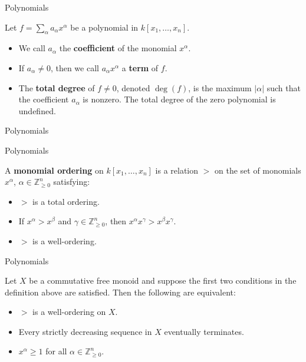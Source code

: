 \documentclass{beamer}
\def\bZ{\mathbb{Z}}
\begin{document}
\begin{frame}{Polynomials}
  \begin{definition}
    Let $f = \sum_\alpha a_\alpha x^\alpha$ be a polynomial in $k[x_1,\dots,x_n]$.
    \begin{itemize}
      \item<2-> We call $a_\alpha$ the \textbf{coefficient} of the monomial $x^\alpha$.
      \item<3-> If $a_\alpha\ne0$, then we call $a_\alpha x^\alpha$ a \textbf{term} of $f$.
      \item<4-> The \textbf{total degree} of $f \ne 0$, denoted $\deg(f)$, is the maximum $|\alpha|$ such that the coefficient $a_\alpha$ is nonzero. The total degree of the zero polynomial is undefined.
    \end{itemize}
  \end{definition}
\end{frame}

\begin{frame}{Polynomials}
\end{frame}

\begin{frame}{Polynomials}
  \begin{definition}
    A \textbf{monomial ordering} on $k[x_1,\dots,x_n]$ is a relation $>$ on the set of monomials $x^\alpha$, $\alpha \in \bZ_{\ge0}^n$ satisfying:
    \begin{itemize}
      \item<2-> $>$ is a total ordering.
      \item<3-> If $x^\alpha > x^\beta$ and $\gamma \in \bZ_{\ge0}^n$, then $x^\alpha x^\gamma > x^\beta x^\gamma$.
      \item<4-> $>$ is a well-ordering.
    \end{itemize}
  \end{definition}
\end{frame}

\begin{frame}{Polynomials}
  \begin{theorem}
    Let $X$ be a commutative free monoid and suppose the first two conditions in the definition above are satisfied. Then the following are equivalent:
    \begin{itemize}
      \item<2-> $>$ is a well-ordering on $X$.
      \item<3-> Every strictly decreasing sequence in $X$ eventually terminates.
      \item<4-> $x^\alpha\ge1$ for all $\alpha \in \bZ_{\ge0}^n$.
    \end{itemize}
  \end{theorem}
\end{frame}
\end{document}
